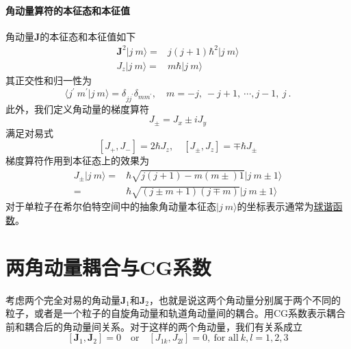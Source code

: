 \paragraph*{角动量算符的本征态和本征值} 角动量$\boldsymbol{J}$的本征态和本征值如下
\begin{align}
	\boldsymbol{J}^2 |j\ m\rangle =& j(j+1)\hbar^2 |j\ m\rangle	\\
	J_z |j\ m\rangle =& m\hbar |j\ m\rangle
\end{align}
其正交性和归一性为
\begin{equation}
	\langle j^{\prime}\ m^{\prime} | j\ m\rangle = \delta_{jj^{\prime}}\delta_{mm^{\prime}}, \quad m = -j,\ -j+1, \ \cdots, j-1,\ j \ .
\end{equation}
此外，我们定义角动量的梯度算符
\begin{equation}
	J_{\pm} = J_{x} \pm i J_{y}
\end{equation}
满足对易式
\begin{equation}
	\left[J_{+}, J_{-}\right] = 2\hbar J_z, \quad \left[J_{\pm}, J_{z}\right] = \mp \hbar J_{\pm}
\end{equation}
梯度算符作用到本征态上的效果为
\begin{equation}
	\begin{aligned}
		J_{\pm} |j\ m\rangle =& \hbar \sqrt{j(j+1) - m(m\pm)1} |j\ m\pm 1\rangle	\\
						   =& \hbar \sqrt{(j\pm m +1) (j\mp m)} |j\ m\pm 1\rangle
	\end{aligned}
\end{equation}
对于单粒子在希尔伯特空间中的抽象角动量本征态$|j\ m\rangle$的坐标表示通常为\underline{球谐函数}。

\section{两角动量耦合与CG系数}
考虑两个完全对易的角动量$\boldsymbol{J}_1$和$\boldsymbol{J}_2$，也就是说这两个角动量分别属于两个不同的粒子，或者是一个粒子的自旋角动量和轨道角动量间的耦合。用CG系数表示耦合前和耦合后的角动量间关系。对于这样的两个角动量，我们有关系成立
\begin{equation}
	\left[\bm{J}_1, \bm{J}_2 \right] = 0 \quad
	\text{or}
	\quad
	\left[J_{1k}, J_{2l}\right] = 0,\ \text{for all}\ k, l = 1, 2, 3
\end{equation}

